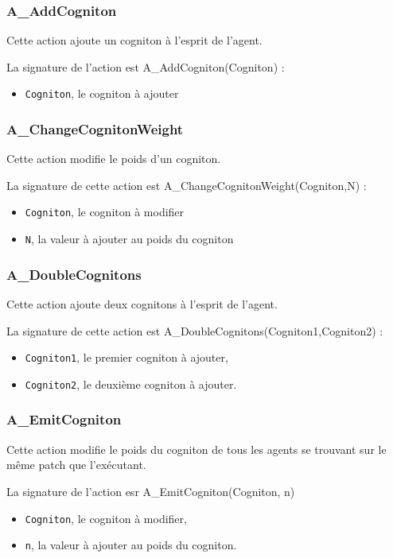 	\subsubsection{A\_AddCogniton}
	Cette action ajoute un cogniton à l'esprit de l'agent. 
	
	La signature de l'action est A\_AddCogniton(Cogniton) :
	
	\begin{itemize}
	\item \texttt{Cogniton},  le cogniton à ajouter
	\end{itemize}
	
	\subsubsection{A\_ChangeCognitonWeight}
	Cette action modifie le poids d'un cogniton. 
	
	La signature de cette action est  A\_ChangeCognitonWeight(Cogniton,N) :
	
	\begin{itemize}
	\item \texttt{Cogniton}, le cogniton à modifier
	\item \texttt{N}, la valeur à ajouter au poids du cogniton
	\end{itemize}
	
	\subsubsection{A\_DoubleCognitons}
	
	Cette action ajoute deux cognitons à l'esprit de l'agent. 
	
	La signature de cette action est A\_DoubleCognitons(Cogniton1,Cogniton2) :
	
	\begin{itemize}
	\item \texttt{Cogniton1}, le premier cogniton à ajouter,
	\item \texttt{Cogniton2}, le deuxième cogniton à ajouter.
	\end{itemize}
	
	\subsubsection{A\_EmitCogniton}
	
	Cette action modifie le poids du cogniton de tous les agents se trouvant sur le même patch que l'exécutant.  
	
	La signature de l'action esr  A\_EmitCogniton(Cogniton, n)
	
	\begin{itemize}
	\item \texttt{Cogniton},  le cogniton à modifier,
	\item \texttt{n}, la valeur à ajouter au poids du cogniton. 
	\end{itemize}